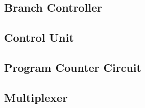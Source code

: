 \subsection{Branch Controller}


\newpage

\subsection{Control Unit}


\newpage

\subsection{Program Counter Circuit}


\newpage

\subsection{Multiplexer}


\newpage
